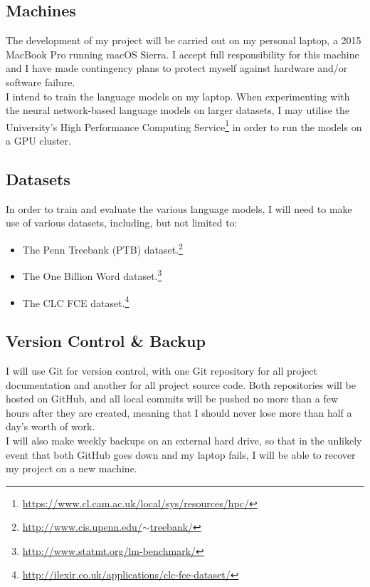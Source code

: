 \documentclass[a4paper, 12pt]{article}
\newcommand{\hlink}[2]{{\href{#1}{#2}}}
\begin{document}
\subsection*{Machines}
The development of my project will be carried out on my personal laptop, a 2015 MacBook Pro running macOS Sierra. I accept full responsibility for this machine and I have made contingency plans to protect myself against hardware and/or software failure. \\

I intend to train the language models on my laptop. When experimenting with the neural network-based language models on larger datasets, I may utilise the University's High Performance Computing Service\footnote{\hlink{https://www.cl.cam.ac.uk/local/sys/resources/hpc/}{https://www.cl.cam.ac.uk/local/sys/resources/hpc/}} in order to run the models on a GPU cluster.

\subsection*{Datasets}
In order to train and evaluate the various language models, I will need to make use of various datasets, including, but not limited to:
\begin{itemize}
\item
	The Penn Treebank (PTB) dataset.\footnote{\hlink{http://www.cis.upenn.edu/~treebank/}{http://www.cis.upenn.edu/$\sim$treebank/}}
\item
	The One Billion Word dataset.\footnote{\hlink{http://www.statmt.org/lm-benchmark/}{http://www.statmt.org/lm-benchmark/}}
\item
	The CLC FCE dataset.\footnote{\hlink{http://ilexir.co.uk/applications/clc-fce-dataset/}{http://ilexir.co.uk/applications/clc-fce-dataset/}}
\end{itemize}

\subsection*{Version Control \& Backup}
I will use Git for version control, with one Git repository for all project documentation and another for all project source code. Both repositories will be hosted on GitHub, and all local commits will be pushed no more than a few hours after they are created, meaning that I should never lose more than half a day's worth of work. \\

I will also make weekly backups on an external hard drive, so that in the unlikely event that both GitHub goes down and my laptop fails, I will be able to recover my project on a new machine.
\end{document}
